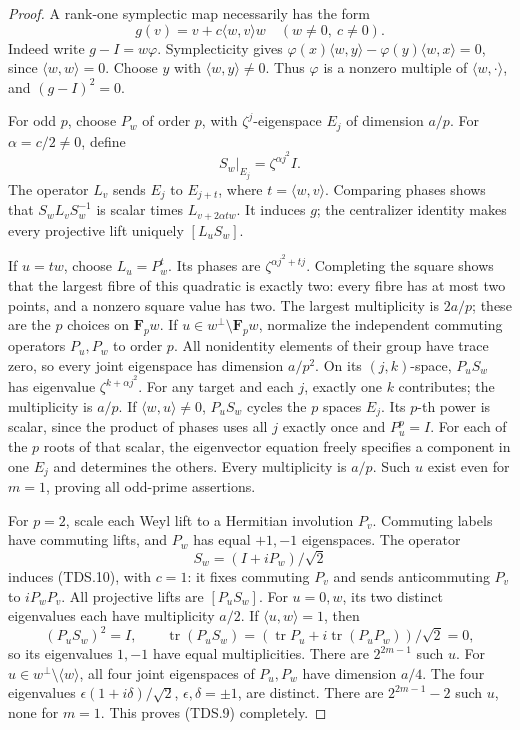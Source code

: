 \begin{proof}
A rank-one symplectic map necessarily has the form
\[
              g(v)=v+c\langle w,v\rangle w\quad(w\ne0,\ c\ne0).
 \tag{TDS.10}
\]
Indeed write \(g-I=w\varphi\).  Symplecticity gives
\(\varphi(x)\langle w,y\rangle-\varphi(y)\langle w,x\rangle=0\),
since \(\langle w,w\rangle=0\).  Choose \(y\) with
\(\langle w,y\rangle\ne0\).  Thus \(\varphi\) is a nonzero multiple
of \(\langle w,\cdot\rangle\), and \((g-I)^2=0\).

For odd \(p\), choose \(P_w\) of order \(p\), with \(\zeta^j\)-eigenspace
\(E_j\) of dimension \(a/p\).  For \(\alpha=c/2\ne0\), define
\[
                          S_w|_{E_j}=\zeta^{\alpha j^2}I.
 \tag{TDS.11}
\]
The operator \(L_v\) sends \(E_j\) to \(E_{j+t}\), where
\(t=\langle w,v\rangle\).  Comparing phases shows that
\(S_wL_vS_w^{-1}\) is scalar times \(L_{v+2\alpha t w}\).
It induces \(g\); the centralizer identity makes every projective
lift uniquely \([L_uS_w]\).

If \(u=t w\), choose \(L_u=P_w^t\).  Its phases are
\(\zeta^{\alpha j^2+t j}\).  Completing the square shows that the
largest fibre of this quadratic is exactly two: every fibre has
at most two points, and a nonzero square value has two.  The largest
multiplicity is \(2a/p\); these are the \(p\) choices on
\(\mathbf F_pw\).
If \(u\in w^\perp\setminus\mathbf F_pw\), normalize the independent
commuting operators \(P_u,P_w\) to order \(p\).
All nonidentity elements of their group have trace zero, so every
joint eigenspace has dimension \(a/p^2\).  On its \((j,k)\)-space,
\(P_uS_w\) has eigenvalue \(\zeta^{k+\alpha j^2}\).
For any target and each \(j\), exactly one \(k\) contributes;
the multiplicity is \(a/p\).
If \(\langle w,u\rangle\ne0\), \(P_uS_w\) cycles the \(p\) spaces
\(E_j\).  Its \(p\)-th power is scalar, since the product of phases
uses all \(j\) exactly once and \(P_u^p=I\).
For each of the \(p\) roots of that scalar, the eigenvector equation
freely specifies a component in one \(E_j\) and determines the
others.  Every multiplicity is \(a/p\).
Such \(u\) exist even for \(m=1\), proving all odd-prime assertions.

For \(p=2\), scale each Weyl lift to a Hermitian involution \(P_v\).
Commuting labels have commuting lifts, and \(P_w\) has equal
\(+1,-1\) eigenspaces.  The operator
\[
                          S_w=(I+iP_w)/\sqrt2
 \tag{TDS.12}
\]
induces (TDS.10), with \(c=1\): it fixes commuting \(P_v\) and
sends anticommuting \(P_v\) to \(iP_wP_v\).
All projective lifts are \([P_uS_w]\).
For \(u=0,w\), its two distinct eigenvalues each have multiplicity
\(a/2\).  If \(\langle u,w\rangle=1\), then
\[
 (P_uS_w)^2=I,\qquad
 \operatorname{tr}(P_uS_w)
  =(\operatorname{tr}P_u+i\operatorname{tr}(P_uP_w))/\sqrt2=0,
 \tag{TDS.13}
\]
so its eigenvalues \(1,-1\) have equal multiplicities.
There are \(2^{2m-1}\) such \(u\).
For \(u\in w^\perp\setminus\langle w\rangle\), all four joint
eigenspaces of \(P_u,P_w\) have dimension \(a/4\).
The four eigenvalues \(\epsilon(1+i\delta)/\sqrt2\),
\(\epsilon,\delta=\pm1\), are distinct.
There are \(2^{2m-1}-2\) such \(u\), none for \(m=1\).
This proves (TDS.9) completely.
\end{proof}

